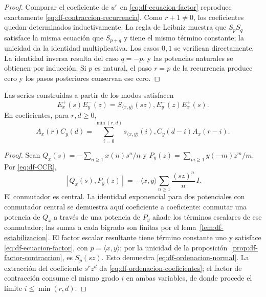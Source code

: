 \begin{proof}
Comparar el coeficiente de \(u^r\) en
\eqref{eq:df-ecuacion-factor} reproduce exactamente
\eqref{eq:df-contraccion-recurrencia}. Como \(r+1\ne0\), los
coeficientes quedan determinados inductivamente. La regla de Leibniz
muestra que \(S_pS_q\) satisface la misma ecuación que \(S_{p+q}\)
y tiene el mismo término constante; la unicidad da la identidad
multiplicativa. Los casos \(0,1\) se verifican directamente. La
identidad inversa resulta del caso \(q=-p\), y las potencias naturales
se obtienen por inducción. Si \(p\) es natural, el paso \(r=p\) de
la recurrencia produce cero y los pasos posteriores conservan ese cero.
\end{proof}

\begin{theorem}
\label{thm:df-ordenacion}
Las series construidas a partir de los modos satisfacen
\begin{equation}
 E^+_x(s)E^-_y(z)
 =S_{\langle x,y\rangle}(sz),E^-_y(z)E^+_x(s).
 \label{eq:df-ordenacion-normal}
\end{equation}
En coeficientes, para \(r,d\geq0\),
\begin{equation}
 A_x(r)C_y(d)
 =\sum_{i=0}^{\min(r,d)}
 s_{\langle x,y\rangle}(i),
 C_y(d-i)A_x(r-i).
 \label{eq:df-ordenacion-coeficientes}
\end{equation}
\end{theorem}

\begin{proof}
Sean
\(Q_x(s)=-\sum_{n\geq1}x(n)s^n/n\) y
\(P_y(z)=\sum_{m\geq1}y(-m)z^m/m\).
Por \eqref{eq:df-CCR},
\[
 [Q_x(s),P_y(z)]
 =-\langle x,y\rangle\sum_{n\geq1}\frac{(sz)^n}{n}\,I.
\]
El conmutador es central. La identidad exponencial para dos potenciales
con conmutador central se demuestra aquí coeficiente a coeficiente:
conmutar una potencia de \(Q_x\) a través de una potencia de \(P_y\)
añade los términos escalares de ese conmutador; las sumas a cada
bigrado son finitas por el lema~\ref{lem:df-estabilizacion}. El factor
escalar resultante tiene término constante uno y satisface
\eqref{eq:df-ecuacion-factor}, con
\(p=\langle x,y\rangle\); por la unicidad de la
proposición~\ref{prop:df-factor-contraccion}, es \(S_p(sz)\).
Esto demuestra \eqref{eq:df-ordenacion-normal}. La extracción del
coeficiente \(s^rz^d\) da
\eqref{eq:df-ordenacion-coeficientes}; el factor de contracción consume
el mismo grado \(i\) en ambas variables, de donde procede el límite
\(i\leq\min(r,d)\).
\end{proof}

